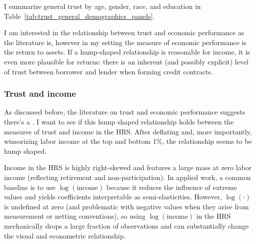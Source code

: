 \par I summarize general trust by age, gender, race, and education in Table~\ref{tab:trust_general_demographics_panels}. %

\label{tab:trust_general_demographics_panels}

\par I am interested in the relationship between trust and economic performance as the literature is, however in my setting the measure of economic performance is the return to assets. If a hump-shaped relationship is reasonable for income, it is even more plausible for returns: there is an inherent (and possibly explicit) level of trust between borrower and lender when forming credit contracts.



\subsubsection{Trust and income}

\par As discussed before, the literature on trust and economic performance suggests there's a . I want to see if this hump shaped relationship holds between the measures of trust and income in the HRS. After deflating and, more importantly, winsorizing labor income at the top and bottom 1\%, the relationship seems to be hump shaped.

\par Income in the HRS is highly right-skewed and features a large mass at zero labor income (reflecting retirement and non-participation). In applied work, a common baseline is to use $\log(\text{income})$ because it reduces the influence of extreme values and yields coefficients interpretable as semi-elasticities. However, $\log(\cdot)$ is undefined at zero (and problematic with negative values when they arise from measurement or netting conventions), so using $\log(\text{income})$ in the HRS mechanically drops a large fraction of observations and can substantially change the visual and econometric relationship.


